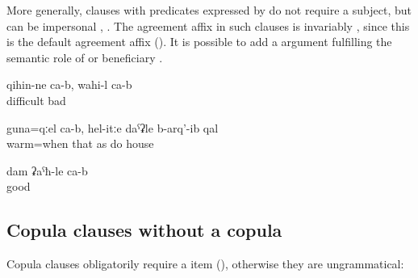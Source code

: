 More generally,  clauses with predicates expressed by  do not require a subject, but can be impersonal , . The  agreement affix in such clauses is invariably , since this is the default agreement affix (). It is possible to add a  argument fulfilling the semantic role of  or beneficiary .
%
\begin{exe}
	\ex	\label{ex:‎It is difficult, it is bad}
	\gll	qihin-ne	ca-b,	wahi-l	ca-b	\\
		difficult		bad		\\
	\glt	{}

	\ex	\label{ex:‎When it is warm (i.e. in warm places) the houses are built like this}
	\gll	guna=qːel	ca-b,	hel-itːe	daˁʡle	b-arq'-ib	qal\\
		warm=when		that	as	do	house	\\
	\glt	{}

	\ex	\label{ex:I am well}
	\gll	dam ʡaˁħ-le ca-b\\
			good	\\
	\glt	{}
\end{exe}



\subsection{Copula clauses without a copula}
\label{ssec:Copula clauses without a copula}

Copula clauses obligatorily require a  item (), otherwise they are ungrammatical: 
%
\begin{exe}

\end{exe}


